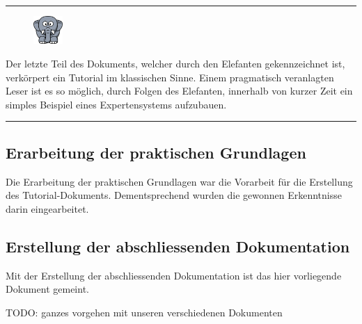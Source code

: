 \noindent\rule[1ex]{\textwidth}{1pt}
\begin{figure}
    \vspace{-18pt}
    \includegraphics[width=0.1\textwidth]{bilder/elephant.png}
\end{figure}
Der letzte Teil des Dokuments, welcher durch den Elefanten gekennzeichnet ist, verkörpert ein Tutorial im klassischen Sinne. Einem pragmatisch veranlagten Leser ist es so möglich, durch Folgen des Elefanten, innerhalb von kurzer Zeit ein simples Beispiel eines Expertensystems aufzubauen.\\
\noindent\rule[1ex]{\textwidth}{1pt}

\subsection{Erarbeitung der praktischen Grundlagen}
\label{subsec:praktische_grundlagen}

Die Erarbeitung der praktischen Grundlagen war die Vorarbeit für die Erstellung des Tutorial-Dokuments. Dementsprechend wurden die gewonnen Erkenntnisse darin eingearbeitet.

\subsection{Erstellung der abschliessenden Dokumentation}
\label{subsec:abschliessende_dokumentation}
Mit der Erstellung der abschliessenden Dokumentation ist das hier vorliegende Dokument gemeint.

TODO: ganzes vorgehen mit unseren verschiedenen Dokumenten  
